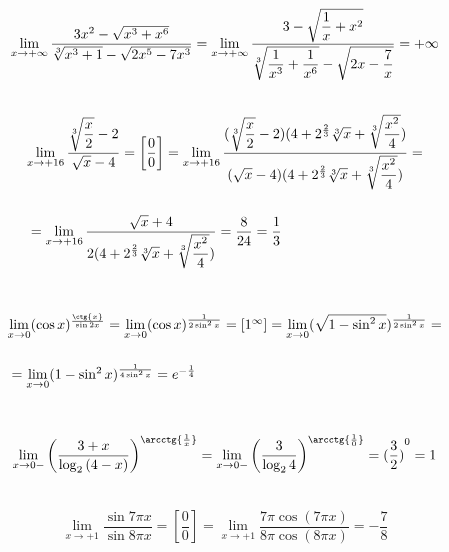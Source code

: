 \documentclass[12pt]{article}
\begin{document}
	\\
	$$
	\begin{array}{l}
		\lim\limits_{x\rightarrow+\infty} \dfrac{3x^2-\sqrt{x^3+x^6}}{\sqrt[3]{x^3+1}-\sqrt{2x^5-7x^3}}=\lim\limits_{x\rightarrow+\infty} \dfrac{3-\sqrt{\dfrac{1}{x}+x^2}}{\sqrt[3]{\dfrac{1}{x^3}+\dfrac{1}{x^6}}-\sqrt{2x-\dfrac{7}{x}}}=+\infty
		\\ \medskip{}{}
	\end{array}
	$$
	$$
	\begin{array}{l} 
		\lim\limits_{x\rightarrow+16} \dfrac{\sqrt[3]{\dfrac{x}{2}}-2}{\sqrt{x}-4} = \left[\dfrac{0}{0} \right]= \lim\limits_{x\rightarrow+16} \dfrac{(\sqrt[3]{\dfrac{x}{2}}-2)(4+2^{\frac{2}{3}} \sqrt[3]{x}+\sqrt[3]{\dfrac{x^2}{4}})}{(\sqrt{x}-4)(4+2^{\frac{2}{3}} \sqrt[3]{x}+\sqrt[3]{\dfrac{x^2}{4}})}=\\ \medskip{}{} \\ \medskip{}{} = \lim\limits_{x\rightarrow+16} \dfrac{\sqrt{x}+4}{2(4+2^{\frac{2}{3}} \sqrt[3]{x}+\sqrt[3]{\dfrac{x^2}{4}})}=\dfrac{8}{24}=\dfrac{1}{3}
	\end{array}
	$$
	\\
	$$
	\begin{array}{l}
		\lim\limits_{x\rightarrow0} (\cos{x})^{\frac{\ctg{x}}{\sin{2x}}}=\lim\limits_{x\rightarrow0} (\cos{x})^{\frac{1}{2\sin^2{x}}}=\left[1^{\infty}\right]=\lim\limits_{x\rightarrow0} (\sqrt{1-\sin^2{x}})^{\frac{1}{2\sin^2{x}}}=\\ \medskip{}{} \\ \medskip{}{}= \lim\limits_{x\rightarrow0} ({1-\sin^2{x}})^{\frac{1}{4\sin^2{x}}}=e^{-\frac{1}{4}}
	\end{array}
	$$
	\\
	$$
	\begin{array}{l}
		\lim\limits_{x\rightarrow0-} \left(\dfrac{3+x}{\log_2 {(4-x)}}\right)^{\arcctg{\frac{1}{x}}}= \lim\limits_{x\rightarrow0-} \left(\dfrac{3}{\log_2 {4}}\right)^{\arcctg{\frac{1}{0}}}= {(\dfrac{3}{2})}^{0}=1
		\\ \medskip{}{}
	\end{array}
	$$
	$$
	\begin{array}{l}
		\lim\limits_{x\rightarrow+1} \dfrac{\sin{7 \pi x}}{\sin{8 \pi x}}=\left[\dfrac{0}{0} \right]=\lim\limits_{x\rightarrow+1} \dfrac{7 \pi \cos{(7 \pi x)}}{8 \pi \cos{(8 \pi x)}}=-\dfrac{7}{8}
	\end{array}
	$$
\end{document}

